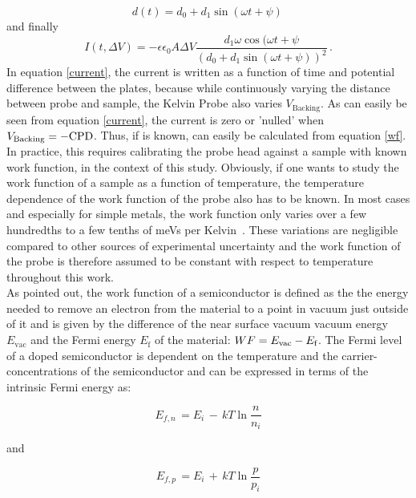 \begin{equation}
	d(t) = d_0 + d_1 \sin (\omega t + \psi)\, 
\end{equation}
and finally
\begin{equation}
\label{current}
	I(t,\Delta V) = -\epsilon \epsilon _0 A \Delta V \frac{d_1 \omega \cos (\omega t + \psi}{(d_0 + d_1 \sin (\omega t + \psi))^2}\, .
\end{equation}
In equation \eqref{current}, the current is written as a function of time and potential difference between the plates, because while continuously varying the distance between probe and sample, the Kelvin Probe also varies $V_{\text{Backing}}$. As can easily be seen from equation \eqref{current}, the current is zero or 'nulled' when $V_{\text{Backing}}=-\text{CPD}$. Thus, if \wfp{} is known, \wfs{} can easily be calculated from equation \eqref{wf}. In practice, this requires calibrating the probe head against a sample with known work function, \hopg{} in the context of this study. Obviously, if one wants to study the work function of a sample as a function of temperature, the temperature dependence of the work function of the probe also has to be known. In most cases and especially for simple metals, the work function only varies over a few hundredths to a few tenths of meVs per Kelvin~\cite{tempdepmet,tempdepmet2,tempdepmet3,tempdepmet4,tempdepmet5}. These variations are negligible compared to other sources of experimental uncertainty and the work function of the probe is therefore assumed to be constant with respect to temperature throughout this work.\\
As pointed out, the work function \wf{} of a semiconductor is defined as the the energy needed to remove an electron from the material to a point in vacuum just outside of it and is given by the difference of the near surface vacuum vacuum energy $E_{\text{vac}}$ and the Fermi energy $E_{\text{f}}$ of the material: $WF = E_{\text{vac}} - E_{\text{f}}$. The Fermi level of a doped semiconductor is dependent on the temperature and the carrier-concentrations of the semiconductor and can be expressed in terms of the intrinsic Fermi energy as:\\[5pt]
\begin{minipage}[c]{0.4\textwidth}
	\begin{equation}
	\label{efn}
	E_{f,n} \, =  E_i \, - \, kT \ln{\frac{n}{n_i}}
	\end{equation}
\end{minipage}	
\hfill
and
\hfill
\begin{minipage}[c]{0.4\textwidth}
	\begin{equation}
	\label{efp}
	E_{f,p} \, = E_i \, + \, kT \ln{\frac{p}{p_i}}
	\end{equation}
\end{minipage}\\[5pt]
